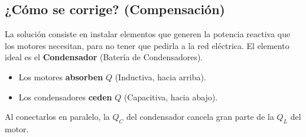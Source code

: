 \documentclass[
  a4paper,
  DIV=11,
  numbers=noendperiod]{scrreprt}
\providecommand{\tightlist}{%
  \setlength{\itemsep}{0pt}\setlength{\parskip}{0pt}}
\begin{document}
\subsection*{¿Cómo se corrige?
(Compensación)}\label{cuxf3mo-se-corrige-compensaciuxf3n}

La solución consiste en instalar elementos que generen la potencia
reactiva que los motores necesitan, para no tener que pedirla a la red
eléctrica. El elemento ideal es el \textbf{Condensador} (Batería de
Condensadores).

\begin{itemize}
\tightlist
\item
  Los motores \textbf{absorben} \(Q\) (Inductiva, hacia arriba).
\item
  Los condensadores \textbf{ceden} \(Q\) (Capacitiva, hacia abajo).
\end{itemize}

Al conectarlos en paralelo, la \(Q_C\) del condensador cancela gran
parte de la \(Q_L\) del motor.
\end{document}
